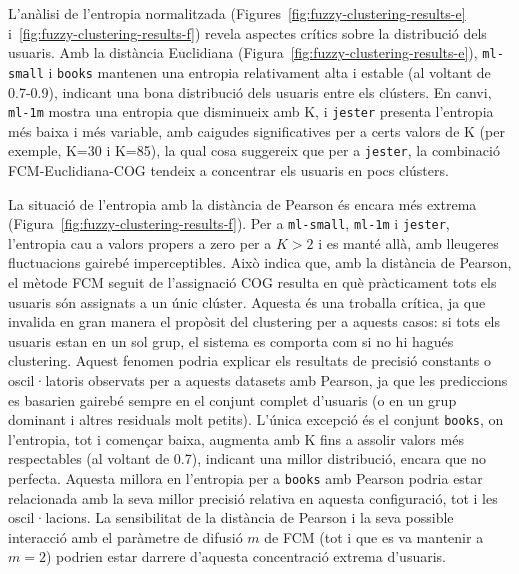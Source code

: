 \documentclass[a4paper,12pt]{report}
\begin{document}
L'anàlisi de l'entropia normalitzada (Figures~\ref{fig:fuzzy-clustering-results-e} i~\ref{fig:fuzzy-clustering-results-f}) revela aspectes crítics sobre la distribució dels usuaris. Amb la distància Euclidiana (Figura~\ref{fig:fuzzy-clustering-results-e}), \texttt{ml-small} i \texttt{books} mantenen una entropia relativament alta i estable (al voltant de 0.7-0.9), indicant una bona distribució dels usuaris entre els clústers. En canvi, \texttt{ml-1m} mostra una entropia que disminueix amb K, i \texttt{jester} presenta l'entropia més baixa i més variable, amb caigudes significatives per a certs valors de K (per exemple, K=30 i K=85), la qual cosa suggereix que per a \texttt{jester}, la combinació FCM-Euclidiana-COG tendeix a concentrar els usuaris en pocs clústers.

La situació de l'entropia amb la distància de Pearson és encara més extrema (Figura~\ref{fig:fuzzy-clustering-results-f}). Per a \texttt{ml-small}, \texttt{ml-1m} i \texttt{jester}, l'entropia cau a valors propers a zero per a $K>2$ i es manté allà, amb lleugeres fluctuacions gairebé imperceptibles. Això indica que, amb la distància de Pearson, el mètode FCM seguit de l'assignació COG resulta en què pràcticament tots els usuaris són assignats a un únic clúster. Aquesta és una troballa crítica, ja que invalida en gran manera el propòsit del clustering per a aquests casos: si tots els usuaris estan en un sol grup, el sistema es comporta com si no hi hagués clustering. Aquest fenomen podria explicar els resultats de precisió constants o oscil·latoris observats per a aquests datasets amb Pearson, ja que les prediccions es basarien gairebé sempre en el conjunt complet d'usuaris (o en un grup dominant i altres residuals molt petits). L'única excepció és el conjunt \texttt{books}, on l'entropia, tot i començar baixa, augmenta amb K fins a assolir valors més respectables (al voltant de 0.7), indicant una millor distribució, encara que no perfecta. Aquesta millora en l'entropia per a \texttt{books} amb Pearson podria estar relacionada amb la seva millor precisió relativa en aquesta configuració, tot i les oscil·lacions. La sensibilitat de la distància de Pearson i la seva possible interacció amb el paràmetre de difusió \(m\) de FCM (tot i que es va mantenir a \(m=2\)) podrien estar darrere d'aquesta concentració extrema d'usuaris.
\end{document}
